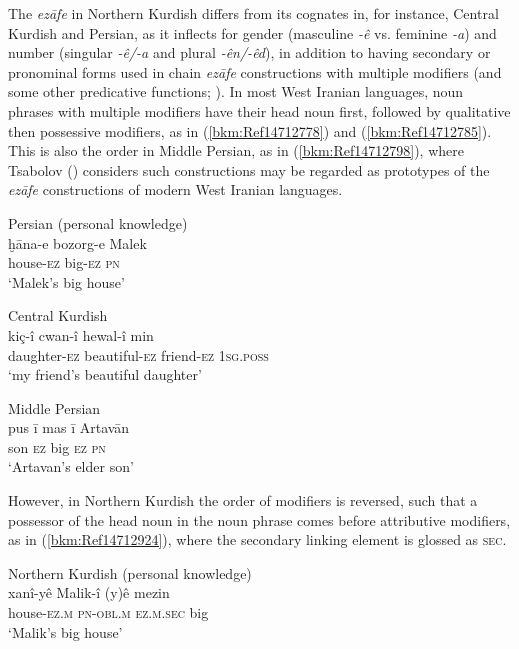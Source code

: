 \documentclass[output=paper]{langsci/langscibook}
\begin{document}
The \textit{ezāfe} in Northern Kurdish differs from its cognates in, for instance, Central Kurdish and Persian, as it inflects for gender (masculine \textit{{}-ê} vs. feminine \textit{{}-a}) and number (singular \textit{{}-ê/-a} and plural \textit{{}-ên/-êd}), in addition to having secondary or pronominal forms used in chain \textit{ezāfe} constructions with multiple modifiers (and some other predicative functions; \citealt{Haig2011,HaigÖpengin2018}). In most West Iranian languages, noun phrases with multiple modifiers have their head noun first, followed by qualitative then possessive modifiers, as in (\ref{bkm:Ref14712778}) and (\ref{bkm:Ref14712785}). This is also the order in Middle Persian, as in (\ref{bkm:Ref14712798}), where Tsabolov (\citeyear[122]{Tsabolov1994}) considers such constructions may be regarded as prototypes of the \textit{ezāfe} constructions of modern West Iranian languages. 

\ea\label{bkm:Ref14712778}Persian (personal knowledge)\\
\gll ḫāna-e bozorg-e Malek\\
     house-\textsc{ez} big-\textsc{ez} \textsc{pn}\\
\glt ‘Malek’s big house’
\z

\ea\label{bkm:Ref14712785}\label{bkm:Ref14771780}Central Kurdish \citep[122]{Tsabolov1994}\\
\gll kiç-î cwan-î hewal-î min\\
     daughter-\textsc{ez} beautiful-\textsc{ez} friend-\textsc{ez} 1\textsc{sg.poss}\\
\glt ‘my friend’s beautiful daughter’
\z

\ea\label{bkm:Ref14712798}Middle Persian \citep[122]{Tsabolov1994}\\
\gll pus ī mas ī Artavān\\
     son \textsc{ez} big \textsc{ez} \textsc{pn}\\
\glt ‘Artavan’s elder son’
\z

However, in Northern Kurdish the order of modifiers is reversed, such that a possessor of the head noun in the noun phrase comes before attributive modifiers, as in (\ref{bkm:Ref14712924}), where the secondary linking element is glossed as \textsc{sec}.  

\ea\label{bkm:Ref14712924}Northern Kurdish (personal knowledge)\\
\gll xanî-yê Malik-î (y)ê mezin\\
     house-\textsc{ez.m} \textsc{pn-obl.m} \textsc{ez.m.sec} big\\
\glt ‘Malik’s big house’
\z
\end{document}
